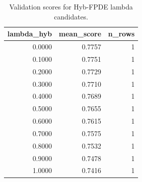 \begin{table}[t]
\caption{Validation scores for Hyb-FPDE lambda candidates.}
\label{tab:lambda_distribution_computed}
\centering
\begin{tabular}{rrr}
\toprule
lambda\_hyb & mean\_score & n\_rows \\
\midrule
0.0000 & 0.7757 & 1 \\
0.1000 & 0.7751 & 1 \\
0.2000 & 0.7729 & 1 \\
0.3000 & 0.7710 & 1 \\
0.4000 & 0.7689 & 1 \\
0.5000 & 0.7655 & 1 \\
0.6000 & 0.7615 & 1 \\
0.7000 & 0.7575 & 1 \\
0.8000 & 0.7532 & 1 \\
0.9000 & 0.7478 & 1 \\
1.0000 & 0.7416 & 1 \\
\bottomrule
\end{tabular}

\end{table}
